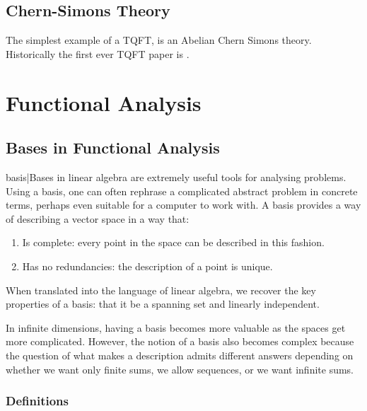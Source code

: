 \documentclass[preprint, 5p, 10pt]{elsarticle}
\theoremstyle{plain}
\begin{document}
\subsection{Chern-Simons Theory}
The simplest example of a TQFT, is an Abelian Chern Simons theory.
Historically the first ever TQFT paper is \cite{TQFTJones_1989}. %
\section{Functional Analysis}
\subsection{Bases in Functional Analysis}
basis|Bases in linear algebra are extremely useful tools for analysing problems. Using a basis, one can often rephrase a complicated abstract problem in concrete terms, perhaps even suitable for a computer to work with. A basis provides a way of describing a vector space in a way that:

\begin{enumerate}%
\item Is complete: every point in the space can be described in this fashion.
\item Has no redundancies: the description of a point is unique.

\end{enumerate}
When translated into the language of linear algebra, we recover the key properties of a basis: that it be a spanning set and linearly independent.

In infinite dimensions, having a basis becomes more valuable as the spaces get more complicated. However, the notion of a basis also becomes complex because the question of what makes a description admits different answers depending on whether we want only finite sums, we allow sequences, or we want infinite sums.

\subsubsection{{Definitions}}\label{definitions_3}
\end{document}
